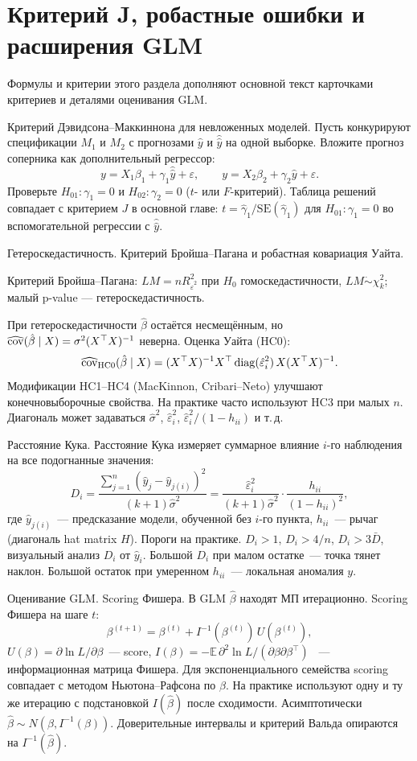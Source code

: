\section{Критерий J, робастные ошибки и расширения GLM}

Формулы и критерии этого раздела дополняют основной текст карточками критериев и деталями оценивания GLM.

Критерий Дэвидсона--Маккиннона для невложенных моделей. Пусть конкурируют спецификации $M_1$ и $M_2$ с прогнозами $\hat y$ и $\hat{\hat y}$ на одной выборке.
Вложите прогноз соперника как дополнительный регрессор:
\[ y = X_1\beta_1 + \gamma_1\hat{\hat y}+\varepsilon,\qquad y = X_2\beta_2 + \gamma_2\hat y+\varepsilon.
\]
Проверьте $H_{01}\colon\gamma_1=0$ и $H_{02}\colon\gamma_2=0$ ($t$- или $F$-критерий).
Таблица решений совпадает с критерием $J$ в основной главе: $t=\hat\gamma_1/\mathrm{SE}(\hat\gamma_1)$ для $H_{01}\colon\gamma_1=0$ во вспомогательной регрессии с $\hat{\hat y}$.

Гетероскедастичность. Критерий Бройша--Пагана и робастная ковариация Уайта.

Критерий Бройша--Пагана: $LM=nR^2_{\hat\varepsilon^2}$ при $H_0$ гомоскедастичности, $LM\dot\sim\chi^2_k$; малый p-value --- гетероскедастичность.

При гетероскедастичности $\hat\beta$ остаётся несмещённым, но $\widehat{\operatorname{cov}}(\hat\beta\mid X)=\sigma^2(X^\top X)^{-1}$ неверна.
Оценка Уайта (HC0):
\[ \widehat{\operatorname{cov}}_{\mathrm{HC0}}(\hat\beta\mid X) = (X^\top X)^{-1} X^\top \operatorname{diag}(\hat\varepsilon_i^2)\, X (X^\top X)^{-1}.
\]
Модификации HC1--HC4 (MacKinnon, Cribari--Neto) улучшают конечновыборочные свойства. На практике часто используют HC3 при малых $n$.
Диагональ может задаваться $\hat\sigma^2$, $\hat\varepsilon_i^2$, $\hat\varepsilon_i^2/(1-h_{ii})$ и т.\,д.

Расстояние Кука. Расстояние Кука измеряет суммарное влияние $i$-го наблюдения на все подогнанные значения:
\[ D_i=\frac{\sum_{j=1}^n(\hat y_j-\hat y_{j(i)})^2}{(k+1)\hat\sigma^2} =\frac{\hat\varepsilon_i^2}{(k+1)\hat\sigma^2}\cdot\frac{h_{ii}}{(1-h_{ii})^2}, \]
где $\hat y_{j(i)}$~--- предсказание модели, обученной без $i$-го пункта, $h_{ii}$~--- рычаг (диагональ hat matrix $H$).
Пороги на практике. $D_i>1$, $D_i>4/n$, $D_i>3\bar D$, визуальный анализ $D_i$ от $\hat y_i$.
Большой $D_i$ при малом остатке~--- точка тянет наклон. Большой остаток при умеренном $h_{ii}$~--- локальная аномалия $y$.

Оценивание GLM. Scoring Фишера. В GLM $\hat\beta$ находят МП итерационно.
Scoring Фишера на шаге $t$:
\[ \beta^{(t+1)}=\beta^{(t)}+I^{-1}(\beta^{(t)})\,U(\beta^{(t)}), \]
$U(\beta)=\partial\ln L/\partial\beta$~--- score, $I(\beta)=-\mathbb{E}\,\partial^2\ln L/(\partial\beta\partial\beta^\top)$ ~--- информационная матрица Фишера.
Для экспоненциального семейства scoring совпадает с методом Ньютона--Рафсона по $\beta$. На практике используют одну и ту же итерацию с подстановкой $I(\hat\beta)$ после сходимости.
Асимптотически $\hat\beta\sim N(\beta,I^{-1}(\beta))$. Доверительные интервалы и критерий Вальда опираются на $I^{-1}(\hat\beta)$.

